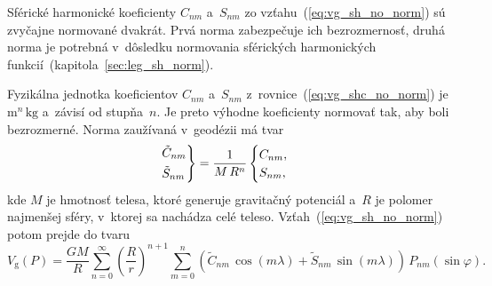 \documentclass[a4paper, 12pt]{book}
\newcommand{\gidx}{\mathrm g}
\begin{document}
Sférické harmonické koeficienty $C_{nm}$ a~$S_{nm}$ zo
vzťahu~(\ref{eq:vg_sh_no_norm}) sú zvyčajne normované dvakrát.  Prvá norma
zabezpečuje ich bezrozmernosť, druhá norma je potrebná v~dôsledku normovania 
sférických harmonických funkcií~(kapitola~\ref{sec:leg_sh_norm}).

Fyzikálna jednotka koeficientov $C_{nm}$ a~$S_{nm}$
z~rovnice~(\ref{eq:vg_shc_no_norm}) je $\mathrm{m}^n \, \mathrm{kg}$ a~závisí 
od stupňa~$n$.  Je preto výhodne koeficienty normovať tak, aby boli
bezrozmerné.  Norma zaužívaná v~geodézii má tvar
%
\begin{equation}
\label{eq:cnm_snm_1st_norm}
\begin{rcases}
\tilde{C}_{nm}\\
\tilde{S}_{nm}
\end{rcases}
= \frac{1}{M \, R^n}
\begin{cases}
C_{nm}{,}\\
S_{nm}{,}
\end{cases}
\end{equation}
%
kde $M$ je hmotnosť telesa, ktoré generuje gravitačný potenciál a~$R$ je
polomer najmenšej sféry, v~ktorej sa nachádza celé teleso.  
Vzťah~(\ref{eq:vg_sh_no_norm})
potom prejde do tvaru
%
\begin{equation}
\label{eq:vg_sh_1st_norm}
V_\gidx(P) = \frac{GM}{R} \sum_{n = 0}^\infty \left( \frac{R}{r} \right)^{n
+ 1} \sum_{m = 0}^{n} \left( \tilde{C}_{nm} \, \cos(m\lambda) + \tilde{S}_{nm}
\, \sin(m\lambda)\right) \, P_{nm}(\sin\varphi){.}
\end{equation}
\end{document}
